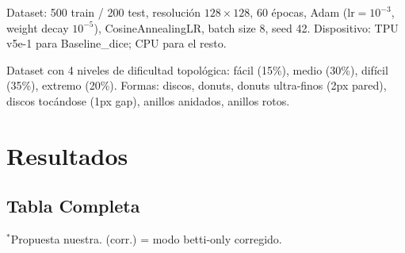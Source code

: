 \documentclass[10pt,twocolumn]{article}
\begin{document}
Dataset: 500 train / 200 test, resolución $128\times128$, 60 épocas, Adam ($\text{lr}=10^{-3}$, weight decay $10^{-5}$), CosineAnnealingLR, batch size 8, seed 42. Dispositivo: TPU v5e-1 para Baseline\_dice; CPU para el resto.

Dataset con 4 niveles de dificultad topológica: fácil (15\%), medio (30\%), difícil (35\%), extremo (20\%). Formas: discos, donuts, donuts ultra-finos (2px pared), discos tocándose (1px gap), anillos anidados, anillos rotos.

\section{Resultados}

\subsection{Tabla Completa}

\begin{table}[H]
\centering
\caption{Resultados de los 12 experimentos (9 originales + 3 corregidos). $\star$ indica cero errores.}
\label{tab:results}
\smallskip
\footnotesize{$^*$Propuesta nuestra. (corr.) = modo betti-only corregido.}
\end{table}
\end{document}
